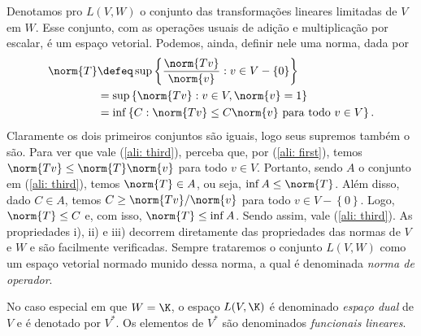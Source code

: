 Denotamos pro \( L(V, W) \) o conjunto das transformações lineares limitadas de \( V \) em \( W \).
Esse conjunto, com as operações usuais de adição e multiplicação por escalar, é um espaço vetorial.
Podemos, ainda, definir nele uma norma, dada por
\begin{align}
    \norm{ T } &\defeq \sup \left\{ \frac{ \norm{ Tv } }{ \norm{ v } } : v \in V - \left\{ 0 \right\} \right\} \label{ali: first} \\
    &= \sup \left\{ \norm{ Tv } : v \in V, \norm{ v } = 1 \right\} \label{ali: sec} \\
    &= \inf \left\{ C : \norm{ Tv } \leq C \norm{ v } \text{ para todo } v \in V \right\}
    \label{ali: third}
.\end{align}
Claramente os dois primeiros conjuntos são iguais, logo seus supremos também o são.
Para ver que vale (\ref{ali: third}), perceba que, por (\ref{ali: first}), temos \( \norm{ Tv } \leq \norm{ T } \norm{ v } \) para todo \( v \in V \).
Portanto, sendo \( A \) o conjunto em (\ref{ali: third}), temos \( \norm{ T } \in A \), ou seja, \( \inf A \leq \norm{ T } \).
Além disso, dado \( C \in A \), temos \( C \geq \norm{ Tv } / \norm{ v } \) para todo \( v \in V - \left\{ 0 \right\} \).
Logo, \( \norm{ T } \leq C \) e, com isso, \( \norm{ T } \leq \inf A \).
Sendo assim, vale (\ref{ali: third}).
As propriedades i), ii) e iii) decorrem diretamente das propriedades das normas de \( V \) e \( W \) e são facilmente verificadas.
Sempre trataremos o conjunto \( L(V, W) \) como um espaço vetorial normado munido dessa norma, a qual é denominada \emph{norma de operador}. 

No caso especial em que \( W = \K \),
o espaço \( L(V, \K) \) é denominado \emph{espaço dual} de \( V \) e é denotado por \( V^{ * } \).
Os elementos de \( V^{ * } \) são denominados \emph{funcionais lineares}.